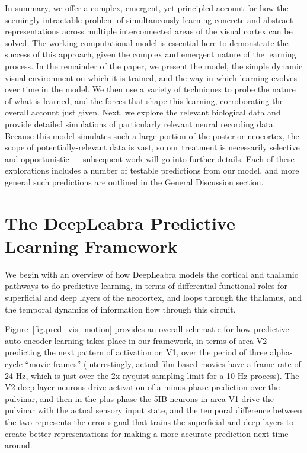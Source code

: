 \documentclass[11pt,twoside]{article}
\newif\myifpdf
\begin{document}
In summary, we offer a complex, emergent, yet principled account for how the seemingly intractable problem of simultaneously learning concrete and abstract representations across multiple interconnected areas of the visual cortex can be solved.  The working computational model is essential here to demonstrate the success of this approach, given the complex and emergent nature of the learning process.  In the remainder of the paper, we present the model, the simple dynamic visual environment on which it is trained, and the way in which learning evolves over time in the model.  We then use a variety of techniques to probe the nature of what is learned, and the forces that shape this learning, corroborating the overall account just given.  Next, we explore the relevant biological data and provide detailed simulations of particularly relevant neural recording data.  Because this model simulates such a large portion of the posterior neocortex, the scope of potentially-relevant data is vast, so our treatment is necessarily selective and opportunistic --- subsequent work will go into further details.  Each of these explorations includes a number of testable predictions from our model, and more general such predictions are outlined in the General Discussion section.  


\section{The DeepLeabra Predictive Learning Framework}

We begin with an overview of how DeepLeabra models the cortical and thalamic pathways to do predictive learning, in terms of differential functional roles for superficial and deep layers of the neocortex, and loops through the thalamus, and the temporal dynamics of information flow through this circuit.

Figure~\ref{fig.pred_vis_motion} provides an overall schematic for how predictive auto-encoder learning takes place in our framework, in terms of area V2 predicting the next pattern of activation on V1, over the period of three alpha-cycle ``movie frames'' (interestingly, actual film-based movies have a frame rate of 24 Hz, which is just over the 2x nyquist sampling limit for a 10 Hz process).  The V2 deep-layer neurons drive activation of a minus-phase prediction over the pulvinar, and then in the plus phase the 5IB neurons in area V1 drive the pulvinar with the actual sensory input state, and the temporal difference between the two represents the error signal that trains the superficial and deep layers to create better representations for making a more accurate prediction next time around.
\end{document}
